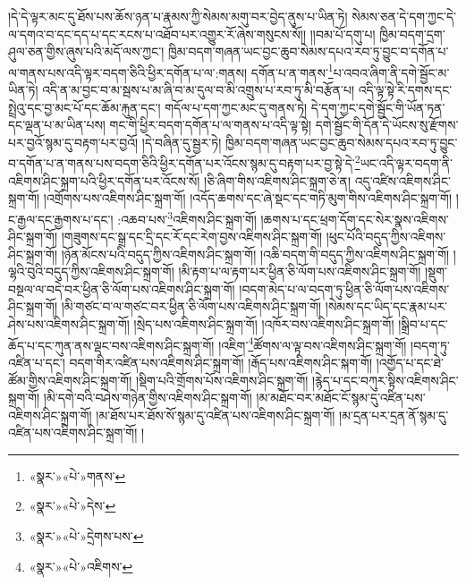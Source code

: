 །དེ་དེ་ལྟར་མང་དུ་ཐོས་པས་ཆོས་ཉན་པ་རྣམས་ཀྱི་སེམས་མགུ་བར་བྱེད་ནུས་པ་ཡིན་ཏེ། སེམས་ཅན་དེ་དག་ཀྱང་དེ་ལ་དགའ་བ་དང་དད་པ་དང་རངས་པ་འཐོབ་པར་འགྱུར་རོ་ཞེས་གསུངས་སོ།། །།བམ་པོ་དགུ་པ། ཁྱིམ་བདག་དྲག་ཤུལ་ཅན་གྱིས་ཞུས་པའི་མདོ་ལས་ཀྱང་། ཁྱིམ་བདག་གཞན་ཡང་བྱང་ཆུབ་སེམས་དཔའ་རབ་ཏུ་བྱུང་བ་དགོན་པ་ལ་གནས་པས་འདི་ལྟར་བདག་ཅིའི་ཕྱིར་དགོན་པ་ལ་:གནས། དགོན་པ་ན་གནས་\footnote{«སྣར་»«པེ་»གནས་}པ་འབའ་ཞིག་ནི་དགེ་སྦྱོང་མ་ཡིན་ཏེ། འདི་ན་མ་བྱང་བ་མ་སྦས་པ་མ་ཞི་བ་མ་དུལ་བ་མི་འགྲུས་པ་རབ་ཏུ་མི་བརྩོན་པ། འདི་ལྟ་སྟེ་རི་དགས་དང་སྤྲེའུ་དང་བྱ་མང་པོ་དང་ཆོམ་རྐུན་དང་། གདོལ་པ་དག་ཀྱང་མང་དུ་གནས་ཏེ། དེ་དག་ཀྱང་དགེ་སྦྱོང་གི་ཡོན་ཏན་དང་ལྡན་པ་མ་ཡིན་པས། གང་གི་ཕྱིར་བདག་དགོན་པ་ལ་གནས་པ་འདི་ལྟ་སྟེ། དགེ་སྦྱོང་གི་དོན་དེ་ཡོངས་སུ་རྫོགས་པར་བྱའོ་སྙམ་དུ་བརྟག་པར་བྱའོ། །དེ་བཞིན་དུ་སྦྱར་ཏེ། ཁྱིམ་བདག་གཞན་ཡང་བྱང་ཆུབ་སེམས་དཔའ་རབ་ཏུ་བྱུང་བ་དགོན་པ་ན་གནས་པས་བདག་ཅིའི་ཕྱིར་དགོན་པར་འོངས་སྙམ་དུ་བརྟག་པར་བྱ་སྟེ་དེ་\footnote{«སྣར་»«པེ་»དེས་}ཡང་འདི་ལྟར་བདག་ནི་འཇིགས་ཤིང་སྐྲག་པའི་ཕྱིར་དགོན་པར་འོངས་སོ། །ཅི་ཞིག་གིས་འཇིགས་ཤིང་སྐྲག་ཅེ་ན། འདུ་འཛིས་འཇིགས་ཤིང་སྐྲག་གོ། །འགྲོགས་པས་འཇིགས་ཤིང་སྐྲག་གོ། །འདོད་ཆགས་དང་ཞེ་སྡང་དང་གཏི་མུག་གིས་འཇིགས་ཤིང་སྐྲག་གོ། །ང་རྒྱལ་དང་རྒྱགས་པ་དང་། :འཆབ་པས་\footnote{«སྣར་»«པེ་»དྲེགས་པས་}འཇིགས་ཤིང་སྐྲག་གོ། །ཆགས་པ་དང་ཕྲག་དོག་དང་སེར་སྣས་འཇིགས་ཤིང་སྐྲག་གོ། །གཟུགས་དང་སྒྲ་དང་དྲི་དང་རོ་དང་རེག་བྱས་འཇིགས་ཤིང་སྐྲག་གོ། །ཕུང་པོའི་བདུད་ཀྱིས་འཇིགས་ཤིང་སྐྲག་གོ། །ཉོན་མོངས་པའི་བདུད་ཀྱིས་འཇིགས་ཤིང་སྐྲག་གོ། །འཆི་བདག་གི་བདུད་ཀྱིས་འཇིགས་ཤིང་སྐྲག་གོ། །ལྷའི་བུའི་བདུད་ཀྱིས་འཇིགས་ཤིང་སྐྲག་གོ། །མི་རྟག་པ་ལ་རྟག་པར་ཕྱིན་ཅི་ལོག་པས་འཇིགས་ཤིང་སྐྲག་གོ། །སྡུག་བསྔལ་ལ་བདེ་བར་ཕྱིན་ཅི་ལོག་པས་འཇིགས་ཤིང་སྐྲག་གོ། །བདག་མེད་པ་ལ་བདག་ཏུ་ཕྱིན་ཅི་ལོག་པས་འཇིགས་ཤིང་སྐྲག་གོ། །མི་གཙང་བ་ལ་གཙང་བར་ཕྱིན་ཅི་ལོག་པས་འཇིགས་ཤིང་སྐྲག་གོ། །སེམས་དང་ཡིད་དང་རྣམ་པར་ཤེས་པས་འཇིགས་ཤིང་སྐྲག་གོ། །སྲེད་པས་འཇིགས་ཤིང་སྐྲག་གོ། །འཁོར་བས་འཇིགས་ཤིང་སྐྲག་གོ། །སྒྲིབ་པ་དང་ཆོད་པ་དང་ཀུན་ནས་ལྡང་བས་འཇིགས་ཤིང་སྐྲག་གོ། །འཇིག་\footnote{«སྣར་»«པེ་»འཇིགས་}ཚོགས་ལ་ལྟ་བས་འཇིགས་ཤིང་སྐྲག་གོ། །བདག་ཏུ་འཛིན་པ་དང་། བདག་གིར་འཛིན་པས་འཇིགས་ཤིང་སྐྲག་གོ། །རྒོད་པས་འཇིགས་ཤིང་སྐག་གོ། །འགྱོད་པ་དང་ཐེ་ཚོམ་གྱིས་འཇིགས་ཤིང་སྐྲག་གོ། །སྡིག་པའི་གྲོགས་པོས་འཇིགས་ཤིང་སྐྲག་གོ། །རྙེད་པ་དང་བཀུར་སྟིས་འཇིགས་ཤིང་སྐྲག་གོ། །མི་དགེ་བའི་བཤེས་གཉེན་གྱིས་འཇིགས་ཤིང་སྐྲག་གོ། །མ་མཐོང་བར་མཐོང་ངོ་སྙམ་དུ་འཛིན་པས་འཇིགས་ཤིང་སྐྲག་གོ། །མ་ཐོས་པར་ཐོས་སོ་སྙམ་དུ་འཛིན་པས་འཇིགས་ཤིང་སྐྲག་གོ། །མ་དྲན་པར་དྲན་ནོ་སྙམ་དུ་འཛིན་པས་འཇིགས་ཤིང་སྐྲག་གོ། །
